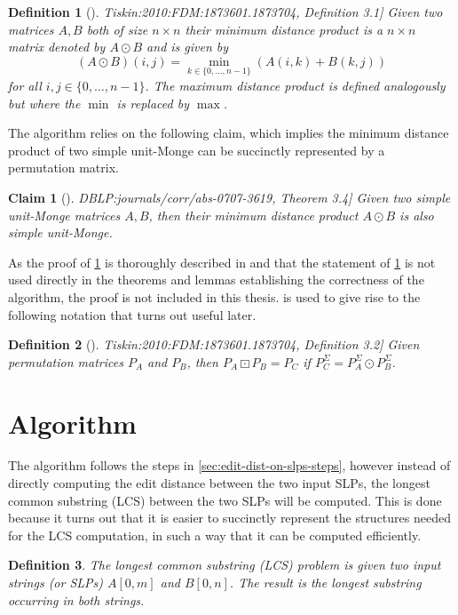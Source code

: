 \documentclass[twoside,11pt,openright]{report}
\newcommand{\str}[3]{#1[#2, #3]}
\newcommand{\refbook}[2]{\cite[#1]{DBLP:journals/corr/abs-0707-3619}, #2}
\newcommand{\reftiskin}[2]{\cite[#1]{Tiskin:2010:FDM:1873601.1873704}, #2}
\newtheorem{mydef}{Definition}
\newtheorem{claim}{Claim}
\begin{document}
\begin{mydef}[\reftiskin{p. 1289}{Definition 3.1}]
  \label{def:minimum-distance-product}
  Given two matrices $A, B$ both of size $n \times n$ their minimum distance product is a $n \times n$ matrix denoted by $A \odot B$ and is given by
  \[
    (A \odot B)(i, j) = \min_{k \in \{ 0, \dots, n - 1 \}} \left( A(i, k) + B(k, j) \right)
  \]
  for all $i, j \in \{0, \dots, n - 1\}$.
  The maximum distance product is defined analogously but where the $\min$ is replaced by $\max$.
\end{mydef}
The algorithm relies on the following claim, which implies the minimum distance product of two simple unit-Monge can be succinctly represented by a permutation matrix.
\begin{claim}[\refbook{p. 16}{Theorem 3.4}]
  \label{claim:unit-monge-min-prod-closed}
  Given two simple unit-Monge matrices $A, B$, then their minimum distance product $A \odot B$ is also simple unit-Monge.
\end{claim}
As the proof of \cref{claim:unit-monge-min-prod-closed} is thoroughly described in \cite[Theorem 3.4, p. 16]{DBLP:journals/corr/abs-0707-3619} and that the statement of \cref{claim:unit-monge-min-prod-closed} is not used directly in the theorems and lemmas establishing the correctness of the algorithm, the proof is not included in this thesis.  is used to give rise to the following notation that turns out useful later.
\begin{mydef}[\reftiskin{p. 1289}{Definition 3.2}]
  Given permutation matrices $P_A$ and $P_B$, then $P_A \boxdot P_B = P_C$ if $P_C^{\Sigma} = P_A^{\Sigma} \odot P_B^{\Sigma}$.
\end{mydef}

\section{Algorithm}
The algorithm follows the steps in \cref{sec:edit-dist-on-slps-steps}, however instead of directly computing the edit distance between the two input SLPs, the longest common substring (LCS) between the two SLPs will be computed. This is done because it turns out that it is easier to succinctly represent the structures needed for the LCS computation, in such a way that it can be computed efficiently.

\begin{mydef}
  The longest common substring (LCS) problem is given two input strings (or SLPs) $\str{A}{0}{m}$ and $\str{B}{0}{n}$. The result is the longest substring occurring in both strings.
\end{mydef}
\end{document}
